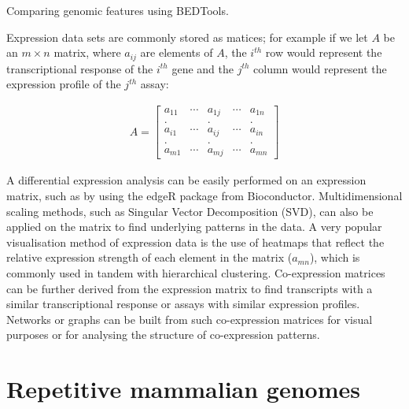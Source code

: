 Comparing genomic features using BEDTools\cite{pmid20110278}.

Expression data sets are commonly stored as matices; for example if we let $A$ be an $m \times n$ matrix, where $a_{ij}$ are elements of $A$, the $i^{th}$ row would represent the transcriptional response of the $i^{th}$ gene and the $j^{th}$ column would represent the expression profile of the $j^{th}$ assay:

\begin{align*}
   A = \begin{bmatrix} a_{11} & \cdots & a_{1j} & \cdots & a_{1n} \\
   . && . && . \\
   a_{i1} & \cdots & a_{ij} & \cdots & a_{in} \\
   . && . && . \\
   a_{m1} & \cdots & a_{mj} & \cdots & a_{mn} \end{bmatrix}
\end{align*}

A differential expression analysis can be easily performed on an expression matrix, such as by using the edgeR package\cite{pmid19910308} from Bioconductor\cite{pmid15461798}. Multidimensional scaling methods, such as Singular Vector Decomposition (SVD), can also be applied on the matrix to find underlying patterns in the data. A very popular visualisation method of expression data is the use of heatmaps that reflect the relative expression strength of each element in the matrix ($a_{mn}$), which is commonly used in tandem with hierarchical clustering. Co-expression matrices can be further derived from the expression matrix to find transcripts with a similar transcriptional response or assays with similar expression profiles. Networks or graphs can be built from such co-expression matrices for visual purposes or for analysing the structure of co-expression patterns.

\section{Repetitive mammalian genomes}

